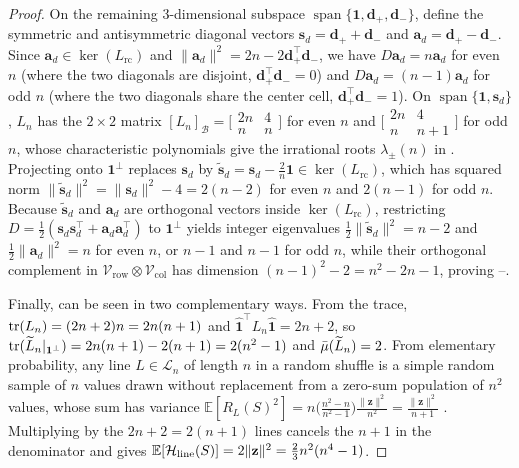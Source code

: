 \begin{proof}
On the remaining $3$-dimensional subspace $\operatorname{span}\{\mathbf{1}, \mathbf{d}_+, \mathbf{d}_-\}$, define the symmetric and antisymmetric diagonal vectors $\mathbf{s}_d = \mathbf{d}_+ + \mathbf{d}_-$ and $\mathbf{a}_d = \mathbf{d}_+ - \mathbf{d}_-$. Since $\mathbf{a}_d \in \ker(L_{\mathrm{rc}})$ and $\|\mathbf{a}_d\|^2 = 2n - 2\mathbf{d}_+^\top\mathbf{d}_-$, we have $D\mathbf{a}_d = n\mathbf{a}_d$ for even $n$ (where the two diagonals are disjoint, $\mathbf{d}_+^\top\mathbf{d}_- = 0$) and $D\mathbf{a}_d = (n-1)\mathbf{a}_d$ for odd $n$ (where the two diagonals share the center cell, $\mathbf{d}_+^\top\mathbf{d}_- = 1$). On $\operatorname{span}\{\mathbf{1}, \mathbf{s}_d\}$, $L_n$ has the $2\times 2$ matrix $[L_n]_{\mathcal{B}} = \bigl[\begin{smallmatrix} 2n & 4 \\ n & n \end{smallmatrix}\bigr]$ for even $n$ and $\bigl[\begin{smallmatrix} 2n & 4 \\ n & n+1 \end{smallmatrix}\bigr]$ for odd $n$, whose characteristic polynomials give the irrational roots $\lambda_\pm(n)$ in . Projecting onto $\mathbf{1}^\perp$ replaces $\mathbf{s}_d$ by $\widetilde{\mathbf{s}}_d = \mathbf{s}_d - \frac{2}{n}\mathbf{1} \in \ker(L_{\mathrm{rc}})$, which has squared norm $\|\widetilde{\mathbf{s}}_d\|^2 = \|\mathbf{s}_d\|^2 - 4 = 2(n-2)$ for even $n$ and $2(n-1)$ for odd $n$. Because $\widetilde{\mathbf{s}}_d$ and $\mathbf{a}_d$ are orthogonal vectors inside $\ker(L_{\mathrm{rc}})$, restricting $D = \frac{1}{2}(\mathbf{s}_d\mathbf{s}_d^\top + \mathbf{a}_d\mathbf{a}_d^\top)$ to $\mathbf{1}^\perp$ yields integer eigenvalues $\frac{1}{2}\|\widetilde{\mathbf{s}}_d\|^2 = n-2$ and $\frac{1}{2}\|\mathbf{a}_d\|^2 = n$ for even $n$, or $n-1$ and $n-1$ for odd $n$, while their orthogonal complement in $\mathcal{V}_{\mathrm{row}}\otimes\mathcal{V}_{\mathrm{col}}$ has dimension $(n-1)^2 - 2 = n^2 - 2n - 1$, proving --.

Finally,  can be seen in two complementary ways. From the trace, $\operatorname{tr}(L_n) = (2n+2)n = 2n(n+1)$ and $\hat{\mathbf{1}}^\top L_n \hat{\mathbf{1}} = 2n+2$, so $\operatorname{tr}(\widetilde{L}_n|_{\mathbf{1}^\perp}) = 2n(n+1) - 2(n+1) = 2(n^2-1)$ and $\bar{\mu}(\widetilde{L}_n) = 2$. From elementary probability, any line $L \in \mathcal{L}_n$ of length $n$ in a random shuffle is a simple random sample of $n$ values drawn without replacement from a zero-sum population of $n^2$ values, whose sum has variance $\mathbb{E}[R_L(S)^2] = n\bigl(\frac{n^2-n}{n^2-1}\bigr)\frac{\|\mathbf{z}\|^2}{n^2} = \frac{\|\mathbf{z}\|^2}{n+1}$ \cite{diaconis1988group}. Multiplying by the $2n+2 = 2(n+1)$ lines cancels the $n+1$ in the denominator and gives $\mathbb{E}[\mathcal{H}_{\mathrm{line}}(S)] = 2\|\mathbf{z}\|^2 = \frac{2}{3}n^2(n^4-1)$.
\end{proof}

